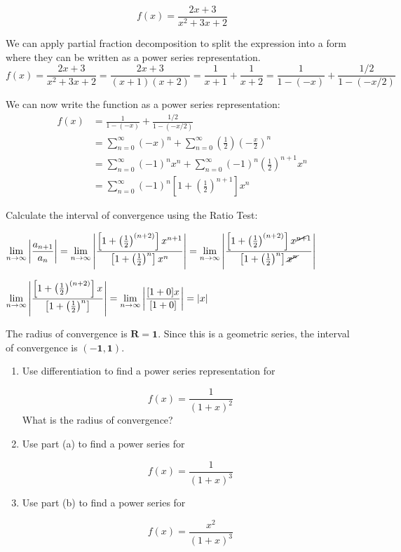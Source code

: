 \documentclass[12pt]{article}
\newcommand{\inftylim}[1]{\mathlarger{\lim_{n \to \infty}#1}}
\begin{document}
\begin{solution}
$$ f(x) = \frac{2x + 3}{x^2 + 3x + 2}$$

We can apply partial fraction decomposition to split the expression into a form where they can be written as a power series representation. 
$$ f(x) = \frac{2x + 3}{x^2+3x+2} = \frac{2x + 3}{(x + 1)(x + 2)} = \frac{1}{x + 1} + \frac{1}{x + 2} = \frac{1}{1 - (-x)} + \frac{1/2}{1 - (-x/2)} $$  

We can now write the function as a power series representation: 
\begin{align*}
f(x) &= \frac{1}{1 - (-x)} + \frac{1/2}{1 - (-x/2)} \\
	&= \sum_{n = 0}^{\infty} (-x)^n  + \sum_{n = 0}^{\infty} \left(\frac{1}{2} \right) \left(-\frac{x}{2}\right)^n \\
	&= \sum_{n = 0}^{\infty} (-1)^nx^n  + \sum_{n = 0}^{\infty} (-1)^n\left(\frac{1}{2} \right)^{n + 1} x^{n} \\
	&= \sum_{n = 0}^{\infty} (-1)^n \left[1 + \left(\frac{1}{2}\right)^{n + 1} \right] x^{n}
\end{align*}

Calculate the interval of convergence using the Ratio Test:

$\inftylim{\left| \frac{a_{n + 1}}{a_n} \right|} = \inftylim{\left| \frac{\left[1 + \left(\frac{1}{2}\right)^{(n + 2)} \right] x^{n + 1}}{\left[1 + \left(\frac{1}{2}\right)^{n} \right] x^{n}}\right|} = \inftylim{\left| \frac{\left[1 + \left(\frac{1}{2}\right)^{(n + 2)} \right] x^{\cancel{n + }1}}{\left[1 + \left(\frac{1}{2}\right)^{n} \right] \cancel{x^{n}}}\right|}$


$ \inftylim{\left| \frac{\left[1 + \left(\frac{1}{2}\right)^{(n + 2)} \right] x}{\left[1 + \left(\frac{1}{2}\right)^{n} \right]}\right|} = \inftylim{\left|\frac{[1 + 0]x}{[1 + 0]}\right| = \left|x \right|}$

The radius of convergence is $\mathbf{R = 1}$. 
Since this is a geometric series, the interval of convergence is $\mathbf{(-1, 1)}$.
\end{solution}

\pagebreak
\begin{enumerate}[label=\alph*)]

\item Use differentiation to find a power series representation for

$$f(x) = \frac{1}{(1 + x)^{2}} $$
What is the radius of convergence? 


\item Use part (a) to find a power series for 

$$f(x) = \frac{1}{(1 + x)^{3}} $$


\item Use part (b) to find a power series for 

$$f(x) = \frac{x^{2}}{(1 + x)^{3}} $$

\end{enumerate}
\end{document}
